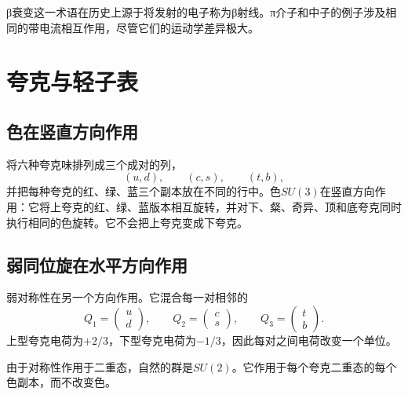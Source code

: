 
{\proseunicodefont β}衰变这一术语在历史上源于将发射的电子称为{\proseunicodefont β}射线。{\proseunicodefont π}介子和中子的例子涉及相同的带电流相互作用，尽管它们的运动学差异极大。

\section{夸克与轻子表}

\subsection{色在竖直方向作用}

将六种夸克味排列成三个成对的列，
\begin{equation}
(u,d),\qquad(c,s),\qquad(t,b),
\end{equation}
并把每种夸克的红、绿、蓝三个副本放在不同的行中。色\(SU(3)\)在竖直方向作用：它将上夸克的红、绿、蓝版本相互旋转，并对下、粲、奇异、顶和底夸克同时执行相同的色旋转。它不会把上夸克变成下夸克。

\subsection{弱同位旋在水平方向作用}

弱对称性在另一个方向作用。它混合每一对相邻的
\begin{equation}
Q_1=\begin{pmatrix}u\\d\end{pmatrix},
\qquad
Q_2=\begin{pmatrix}c\\s\end{pmatrix},
\qquad
Q_3=\begin{pmatrix}t\\b\end{pmatrix}.
\label{eq:l5-quark-doublets}
\end{equation}
上型夸克电荷为\(+2/3\)，下型夸克电荷为\(-1/3\)，因此每对之间电荷改变一个单位。

由于对称性作用于二重态，自然的群是\(SU(2)\)。它作用于每个夸克二重态的每个色副本，而不改变色。

